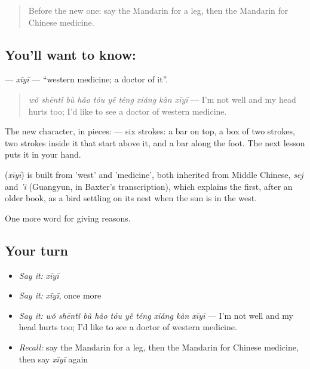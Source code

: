 \label{lesson:ZH-C231-xiyi}



\begin{quote}
Before the new one: say the Mandarin for a leg, then the Mandarin for Chinese medicine.
\end{quote}

\subsection*{You'll want to know: }
\textbf{} — \emph{xīyī} — \textquotedblleft{}western medicine; a doctor of it\textquotedblright{}.

\begin{quote}
\textbf{} \emph{wǒ shēntǐ bù hǎo tóu yě téng xiǎng kàn xīyī} — I'm not well and my head hurts too; I'd like to see a doctor of western medicine.
\end{quote}

The new character, in pieces:  — six strokes: a bar on top, a box of two strokes, two strokes inside it that start above it, and a bar along the foot. The next lesson puts it in your hand.

\begin{cousinweb}
\textbf{} (\emph{xīyī}) is built from  'west' and  'medicine', both inherited from Middle Chinese, \emph{sej} and \emph{'i} (Guangyun, in Baxter's transcription), which explains the first, after an older book, as a bird settling on its nest when the sun is in the west.
\end{cousinweb}

\begin{grammarlens}[title={What you've built}]
One more word for giving reasons.
\end{grammarlens}

\subsection*{Your turn}
\begin{itemize}
\raggedright
  \item \emph{Say it:} \emph{xīyī}
  \item \emph{Say it:} \emph{xīyī}, once more
  \item \emph{Say it:} \emph{wǒ shēntǐ bù hǎo tóu yě téng xiǎng kàn xīyī} — I'm not well and my head hurts too; I'd like to see a doctor of western medicine.
  \item \emph{Recall:} say the Mandarin for a leg, then the Mandarin for Chinese medicine, then say \emph{xīyī} again
\end{itemize}

